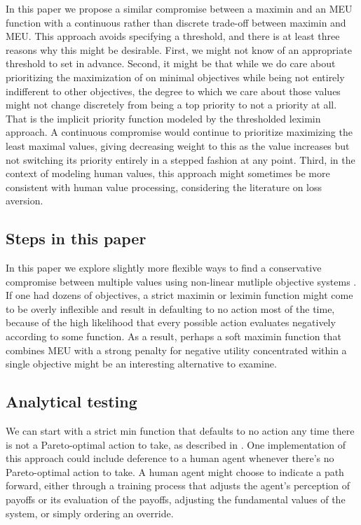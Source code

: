 In this paper we propose a similar compromise between a maximin and an MEU function with a continuous rather than discrete trade-off between maximin and MEU. This approach avoids specifying a threshold, and there is at least three reasons why this might be desirable. First, we might not know of an appropriate threshold to set in advance. Second, it might be that while we do care about prioritizing the maximization of on minimal objectives while being not entirely indifferent to other objectives, the degree to which we care about those values might not change discretely from being a top priority to not a priority at all. That is the implicit priority function modeled by the thresholded leximin approach. A continuous compromise would continue to prioritize maximizing the least maximal values, giving decreasing weight to this as the value increases but not switching its priority entirely in a stepped fashion at any point. Third, in the context of modeling human values, this approach might sometimes be more consistent with human value processing, considering the literature on loss aversion.

\subsection{Steps in this paper}

In this paper we explore slightly more flexible ways to find a conservative compromise between multiple values using non-linear mutliple objective systems \cite{rolf_need_2020}. If one had dozens of objectives, a strict maximin or leximin function might come to be overly inflexible and result in defaulting to no action most of the time, because of the high likelihood that every possible action evaluates negatively according to some function. As a result, perhaps a soft maximin function that combines MEU with a strong penalty for negative utility concentrated within a single objective might be an interesting alternative to examine.

 
\subsection{Analytical testing}

We can start with a strict min function that defaults to no action any time there is not a Pareto-optimal action to take, as described in \cite{vamplew_human-aligned_2018}. One implementation of this approach could include  deference to a human agent whenever there's no Pareto-optimal action to take. A human agent might choose to indicate a path forward, either through a training process that adjusts the agent's perception of payoffs or its evaluation of the payoffs, adjusting the fundamental values of the system, or simply ordering an override.


